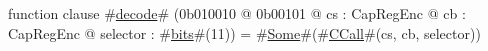 function clause #\hyperref[sailMIPSzdecode]{decode}# (0b010010 @ 0b00101 @ cs : CapRegEnc @ cb : CapRegEnc @ selector : #\hyperref[sailMIPSzbits]{bits}#(11)) = #\hyperref[sailMIPSzSome]{Some}#(#\hyperref[sailMIPSzCCall]{CCall}#(cs, cb, selector))
